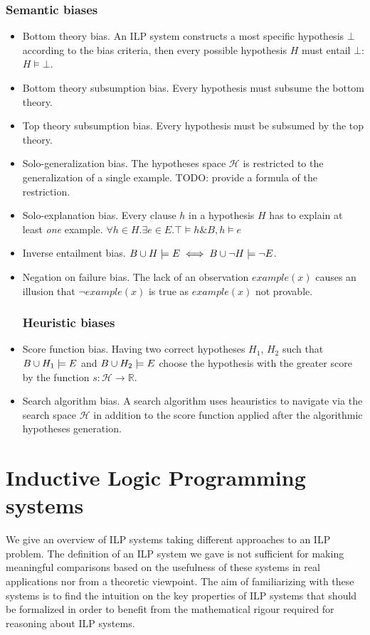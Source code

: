 \subsubsection{Semantic biases}
\begin{itemize}
\item Bottom theory bias. An ILP system constructs a most specific hypothesis $\bot$ according to the bias criteria, then every possible hypothesis $H$ must entail $\bot$: $H \models \bot$.
\item Bottom theory subsumption bias. Every hypothesis must subsume the bottom theory.
\item Top theory subsumption bias. Every hypothesis must be subsumed by the top theory.
\item Solo-generalization bias. The hypotheses space $\mathcal{H}$ is restricted to the generalization of a single example. \cite{muggleton2012}
TODO: provide a formula of the restriction.
\item Solo-explanation bias. Every clause $h$ in a hypothesis $H$ has to explain at least \emph{one} example.
$\forall h \in H. \exists e \in E. \top \models h \& B, h \models e$
\item Inverse entailment bias.
$B \cup H \models E \iff B \cup \neg H \models \neg E$.
\item Negation on failure bias. The lack of an observation $example(x)$
causes an illusion that $\neg example(x)$ is true as $example(x)$ not provable.

\subsubsection{Heuristic biases}
\item Score function bias. Having two correct hypotheses $H_1$, $H_2$ such that $B \cup H_1 \models E$ and $B \cup H_2 \models E$ choose the hypothesis with the greater score by the function $s:\mathcal{H} \to \mathbb{R}$.
\item Search algorithm bias. A search algorithm uses heauristics to navigate via the search space $\mathcal{H}$ in addition to the score function applied after the algorithmic hypotheses generation.
\end{itemize}

\section{Inductive Logic Programming systems}
We give an overview of ILP systems taking different approaches to an ILP problem. The definition of an ILP system we gave is not sufficient for making meaningful comparisons based on the usefulness of these systems in real applications nor from a theoretic viewpoint. The aim of familiarizing with these systems is to find the intuition on the key properties of ILP systems that should be formalized in order to benefit from the mathematical rigour required for reasoning about ILP systems.

